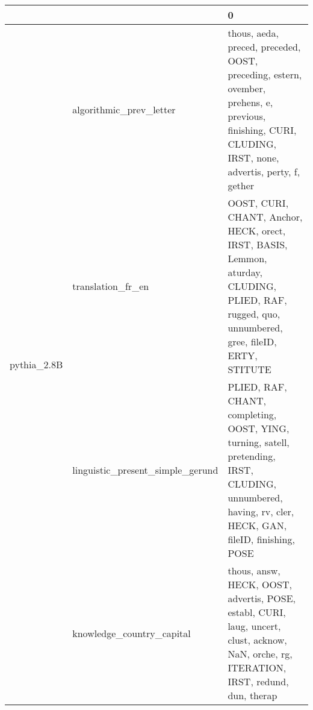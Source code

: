 \begin{tabular}{lll}
\toprule
 &  & 0 \\
\midrule
\multirow[t]{4}{*}{pythia_2.8B} & algorithmic_prev_letter & thous, aeda, preced, preceded, OOST, preceding, estern, ovember, prehens, e, previous, finishing, CURI, CLUDING, IRST, none, advertis, perty, f, gether \\
 & translation_fr_en & OOST, CURI, CHANT, Anchor, HECK, orect, IRST, BASIS, Lemmon, aturday, CLUDING, PLIED, RAF, rugged, quo, unnumbered, gree, fileID, ERTY, STITUTE \\
 & linguistic_present_simple_gerund & PLIED, RAF, CHANT, completing, OOST, YING, turning, satell, pretending, IRST, CLUDING, unnumbered, having, rv, cler, HECK, GAN, fileID, finishing, POSE \\
 & knowledge_country_capital & thous, answ, HECK, OOST, advertis, POSE, establ, CURI, laug, uncert, clust, acknow, NaN, orche, rg, ITERATION, IRST, redund, dun, therap \\
\cline{1-3}
\bottomrule
\end{tabular}

